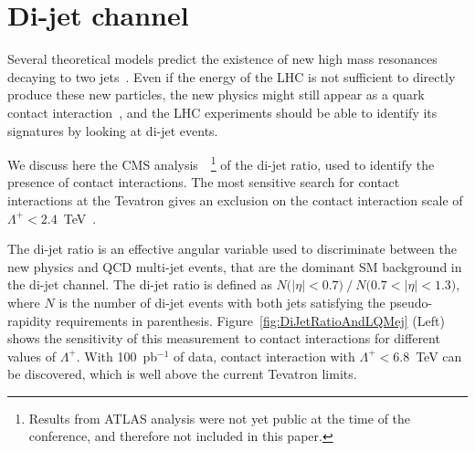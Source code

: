 \documentclass{cimento}
\begin{document}
\section{Di-jet channel} \label{dijet}
Several theoretical models predict the existence of new 
high mass resonances decaying to two 
jets~\cite{Baur:1989kv,Bagger:1987fz,Angelopoulos:1986uq}.
Even if the energy of the LHC is not sufficient to directly produce 
these new particles, the new physics might still appear as 
a quark contact interaction~\cite{Eichten:1983hw}, 
and the LHC experiments should 
be able to identify its signatures by looking at di-jet events.

We discuss here the CMS analysis~\cite{DIJETSNOTE}~\footnote{Results 
from ATLAS analysis were not yet public at the time 
of the conference, and therefore not included in this paper.}
of the di-jet ratio, used to identify the presence of contact interactions. 
The most sensitive search for contact interactions at the Tevatron 
gives an exclusion on the contact interaction scale 
of $\Lambda^{+} < 2.4$~TeV~\cite{Abbott:1998wh}.  

The di-jet ratio is an effective angular variable used to 
discriminate between the new physics and QCD multi-jet events, 
that are the dominant SM background in the di-jet channel. The di-jet ratio is 
defined as $N\mbox{(}|\eta|<0.7\mbox{)}~/~N\mbox{(}0.7<|\eta|< 1.3 \mbox{)}$, 
where $N$ is the number of di-jet events with both jets satisfying the 
pseudo-rapidity requirements in parenthesis. 
Figure~\ref{fig:DiJetRatioAndLQMej} (Left) shows the sensitivity of this 
measurement to contact interactions for different values of $\Lambda^{+}$. 
With 100~pb$^{-1}$ of data, contact interaction with
$\Lambda^{+} < 6.8$~TeV can be discovered, which is well above the 
current Tevatron limits.
 
\end{document}
